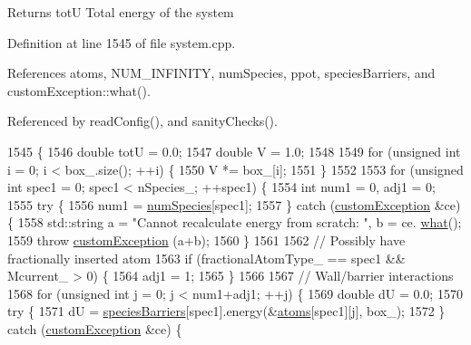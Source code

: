 \begin{DoxyReturn}{Returns}
tot\-U Total energy of the system 
\end{DoxyReturn}


Definition at line 1545 of file system.\-cpp.



References atoms, N\-U\-M\-\_\-\-I\-N\-F\-I\-N\-I\-T\-Y, num\-Species, ppot, species\-Barriers, and custom\-Exception\-::what().



Referenced by read\-Config(), and sanity\-Checks().


\begin{DoxyCode}
1545                                        \{
1546     \textcolor{keywordtype}{double} totU = 0.0;
1547     \textcolor{keywordtype}{double} V = 1.0;
1548 
1549     \textcolor{keywordflow}{for} (\textcolor{keywordtype}{unsigned} \textcolor{keywordtype}{int} i = 0; i < box\_.size(); ++i) \{
1550         V *= box\_[i];
1551     \}
1552 
1553     \textcolor{keywordflow}{for} (\textcolor{keywordtype}{unsigned} \textcolor{keywordtype}{int} spec1 = 0; spec1 < nSpecies\_; ++spec1) \{
1554         \textcolor{keywordtype}{int} num1 = 0, adj1 = 0;
1555         \textcolor{keywordflow}{try} \{
1556             num1 = \hyperlink{classsim_system_a9eea865e6dc1cff377b1e79c4d9c23f0}{numSpecies}[spec1];
1557         \} \textcolor{keywordflow}{catch} (\hyperlink{classcustom_exception}{customException} &ce) \{
1558             std::string a = \textcolor{stringliteral}{"Cannot recalculate energy from scratch: "}, b = ce.
      \hyperlink{classcustom_exception_aeb6ab5848b038adfc68fde86a512f691}{what}();
1559             \textcolor{keywordflow}{throw} \hyperlink{classcustom_exception}{customException} (a+b);
1560         \}
1561 
1562         \textcolor{comment}{// Possibly have fractionally inserted atom}
1563         \textcolor{keywordflow}{if} (fractionalAtomType\_ == spec1 && Mcurrent\_ > 0) \{
1564             adj1 = 1;
1565         \}
1566 
1567         \textcolor{comment}{// Wall/barrier interactions}
1568         \textcolor{keywordflow}{for} (\textcolor{keywordtype}{unsigned} \textcolor{keywordtype}{int} j = 0; j < num1+adj1; ++j) \{
1569             \textcolor{keywordtype}{double} dU = 0.0;
1570             \textcolor{keywordflow}{try} \{
1571                 dU = \hyperlink{classsim_system_a5ae652ff4519f39c3862abae32a9581b}{speciesBarriers}[spec1].energy(&\hyperlink{classsim_system_a90421b19082f7fb8fc23b7264b1161e4}{atoms}[spec1][j], box\_);
1572             \} \textcolor{keywordflow}{catch} (\hyperlink{classcustom_exception}{customException} &ce) \{

\end{DoxyCode}

